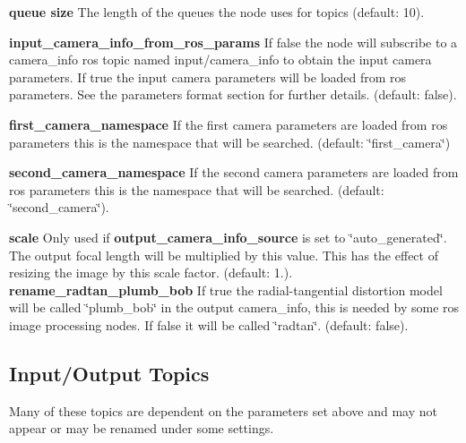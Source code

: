 \begin{DoxyItemize}
\item {\bfseries queue size} The length of the queues the node uses for topics (default\+: 10).
\item {\bfseries input\+\_\+camera\+\_\+info\+\_\+from\+\_\+ros\+\_\+params} If false the node will subscribe to a camera\+\_\+info ros topic named input/camera\+\_\+info to obtain the input camera parameters. If true the input camera parameters will be loaded from ros parameters. See the parameters format section for further details. (default\+: false).
\item {\bfseries first\+\_\+camera\+\_\+namespace} If the first camera parameters are loaded from ros parameters this is the namespace that will be searched. (default\+: \char`\"{}first\+\_\+camera\char`\"{})
\item {\bfseries second\+\_\+camera\+\_\+namespace} If the second camera parameters are loaded from ros parameters this is the namespace that will be searched. (default\+: \char`\"{}second\+\_\+camera\char`\"{}).
\item {\bfseries scale} Only used if {\bfseries output\+\_\+camera\+\_\+info\+\_\+source} is set to \char`\"{}auto\+\_\+generated\char`\"{}. The output focal length will be multiplied by this value. This has the effect of resizing the image by this scale factor. (default\+: 1.). {\bfseries rename\+\_\+radtan\+\_\+plumb\+\_\+bob} If true the radial-\/tangential distortion model will be called \char`\"{}plumb\+\_\+bob\char`\"{} in the output camera\+\_\+info, this is needed by some ros image processing nodes. If false it will be called \char`\"{}radtan\char`\"{}. (default\+: false).
\end{DoxyItemize}\hypertarget{md_vision_layer_image_undistort_README_autotoc_md102}{}\subsection{Input/\+Output Topics}\label{md_vision_layer_image_undistort_README_autotoc_md102}
Many of these topics are dependent on the parameters set above and may not appear or may be renamed under some settings.
